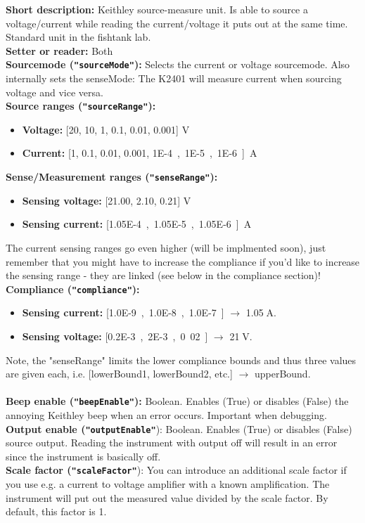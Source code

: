 \textbf{\textsf{Short description}:} Keithley source-measure unit. Is able to source a voltage/current while reading the current/voltage it puts out at the same time. Standard unit in the fishtank lab.\\
\textbf{\textsf{Setter or reader}:} Both\\
\textbf{\textsf{Sourcemode} (\texttt{"sourceMode"}):} Selects the current or voltage sourcemode. Also internally sets the senseMode: The K2401 will measure current when sourcing voltage and vice versa.\\
\textbf{\textsf{Source ranges} (\texttt{"sourceRange"}):}
\begin{itemize}[noitemsep]
\item \textbf{\textsf{Voltage:}} [20, 10, 1, 0.1, 0.01, 0.001] V\\
\item \textbf{\textsf{Current:}} [1, 0.1, 0.01, 0.001, \SI{1E-4}, \SI{1E-5}, \SI{1E-6}] A\\
\end{itemize}
\textbf{\textsf{Sense/Measurement ranges} (\texttt{"senseRange"}):}
\begin{itemize}[noitemsep]
\item \textbf{\textsf{Sensing voltage:}} [21.00, 2.10, 0.21] V\\
\item \textbf{\textsf{Sensing current:}} [\SI{1.05E-4}, \SI{1.05E-5}, \SI{1.05E-6}] A
\end{itemize}
The current sensing ranges go even higher (will be implmented soon), just remember that you might have to increase the compliance if you'd like to increase the sensing range - they are linked (see below in the compliance section)!\\
\textbf{\textsf{Compliance} (\texttt{"compliance"}):}
\begin{itemize}[noitemsep]
\item \textbf{\textsf{Sensing current:}} [\SI{1.0E-9}, \SI{1.0E-8}, \SI{1.0E-7}] $\rightarrow$ 1.05$\;$A. \\
\item \textbf{\textsf{Sensing voltage:}} [\SI{0.2E-3}, \SI{2E-3}, 0.02] $\rightarrow$ 21$\;$V.\\
\end{itemize}
Note, the "senseRange" limits the lower compliance bounds and thus three values are given each, i.e. [lowerBound1, lowerBound2, etc.] $\rightarrow$ upperBound.\\
\\
\textbf{\textsf{Beep enable} (\texttt{"beepEnable"}):} Boolean. Enables (True) or disables (False) the annoying Keithley beep when an error occurs. Important when debugging.\\
\textbf{\textsf{Output enable} (\texttt{"outputEnable"}}): Boolean. Enables (True) or disables (False) source output. Reading the instrument with output off will result in an error since the instrument is basically off.\\
\textbf{\textsf{Scale factor} (\texttt{"scaleFactor"}}): You can introduce an additional scale factor if you use e.g. a current to voltage amplifier with a known amplification. The instrument will put out the measured value divided by the scale factor. By default, this factor is 1.
